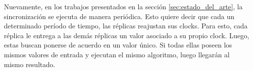 


Nuevamente, en los trabajos presentados en la sección \ref{sec:estado_del_arte}, la sincronización se ejecuta de manera periódica. Esto quiere decir que cada un determinado período de tiempo, las réplicas reajustan sus clocks. Para esto, cada réplica le entrega a las demás réplicas un valor asociado a su propio clock. Luego, estas buscan ponerse de acuerdo en un valor único. Si todas ellas poseen los mismos valores de entrada y ejecutan el mismo algoritmo, luego llegarán al mismo resultado.

